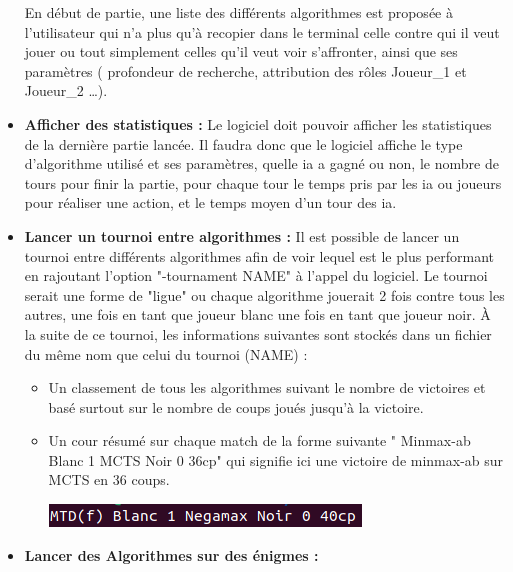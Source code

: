 \documentclass{article}
\begin{document}
\begin{itemize}
        \newline
        En début de partie, une liste des différents algorithmes est proposée à l'utilisateur qui n'a plus qu'à recopier dans le terminal celle contre qui il veut jouer ou tout simplement celles qu'il veut voir s'affronter, ainsi que ses paramètres ( profondeur de recherche, attribution des rôles Joueur\_1 et Joueur\_2 \dots).
    \medskip
    \item \textbf{Afficher des statistiques :
    }
        \newline
        Le logiciel doit pouvoir afficher les statistiques de la dernière partie lancée. 
        \newline
        Il faudra donc que le logiciel affiche le type d'algorithme utilisé et ses paramètres, quelle ia a gagné ou non, le nombre de tours pour finir la partie, pour chaque tour le temps pris par les ia ou joueurs pour réaliser une action, et le temps moyen d'un tour des ia.
    \medskip
    \item \textbf{Lancer un tournoi entre algorithmes : }
    \newline
        Il est possible de lancer un tournoi entre différents algorithmes afin de voir lequel est le plus performant en rajoutant l'option "-tournament NAME" à l'appel du logiciel.
        Le tournoi serait une forme de "ligue" ou chaque algorithme jouerait 2 fois contre tous les autres, une fois en tant que joueur blanc une fois en tant que joueur noir.
        \newline
        À la suite de ce tournoi, les informations suivantes sont stockés dans un fichier du même nom que celui du tournoi (NAME) :
        \begin{itemize}
            \item Un classement de tous les algorithmes suivant le nombre de victoires et basé surtout sur le nombre de coups joués jusqu'à la victoire.
            \item Un cour résumé sur chaque match de la forme suivante " Minmax-ab Blanc 1 MCTS Noir 0 36cp" qui signifie ici une victoire de minmax-ab sur MCTS en 36 coups.
            \newline
            \centerline{\includegraphics[scale = 0.5]{img/Summarytournament.png}}
        \end{itemize}
    \medskip
    \item \textbf{Lancer des Algorithmes sur des énigmes : }

\end{itemize}
\end{document}
